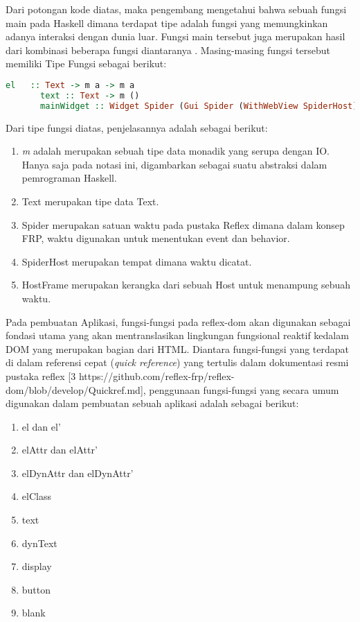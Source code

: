\documentclass[pi.tex]{subfile}
\begin{document}
  Dari potongan kode diatas, maka pengembang mengetahui bahwa sebuah fungsi main pada Haskell dimana terdapat tipe  adalah fungsi yang memungkinkan adanya interaksi dengan dunia luar. Fungsi main tersebut juga merupakan hasil dari kombinasi beberapa fungsi diantaranya . Masing-masing fungsi tersebut memiliki Tipe Fungsi sebagai berikut:\\
    \begin{lstlisting}[language=Haskell]
       el   :: Text -> m a -> m a
       text :: Text -> m ()
       mainWidget :: Widget Spider (Gui Spider (WithWebView SpiderHost) (HostFrame Spider)) () -> IO ()
    \end{lstlisting}

    Dari tipe fungsi diatas, penjelasannya adalah sebagai berikut:
    \begin{enumerate}
    \item \emph{m} adalah merupakan sebuah tipe data monadik yang serupa dengan IO. Hanya saja pada notasi ini,  digambarkan sebagai suatu abstraksi dalam pemrograman Haskell.
    \item Text merupakan tipe data Text.
    \item Spider merupakan satuan waktu pada pustaka Reflex dimana dalam konsep FRP, waktu digunakan untuk menentukan event dan behavior.
    \item SpiderHost merupakan tempat dimana waktu dicatat.
    \item HostFrame merupakan kerangka dari sebuah Host untuk menampung sebuah waktu.
\end{enumerate}
    Pada pembuatan Aplikasi, fungsi-fungsi pada reflex-dom akan digunakan sebagai fondasi utama yang akan mentranslasikan lingkungan fungsional reaktif kedalam DOM yang merupakan bagian dari HTML. Diantara fungsi-fungsi yang terdapat di dalam referensi cepat (\emph{quick reference}) yang tertulis dalam dokumentasi resmi pustaka reflex [3 https://github.com/reflex-frp/reflex-dom/blob/develop/Quickref.md], penggunaan fungsi-fungsi yang secara umum digunakan dalam pembuatan sebuah aplikasi adalah sebagai berikut:\\

    \begin{enumerate}
    \item el dan el'
    \item elAttr dan elAttr'
    \item elDynAttr dan elDynAttr'
    \item elClass
    \item text
    \item dynText
    \item display
    \item button
    \item blank

    \end{enumerate}
\end{document}
